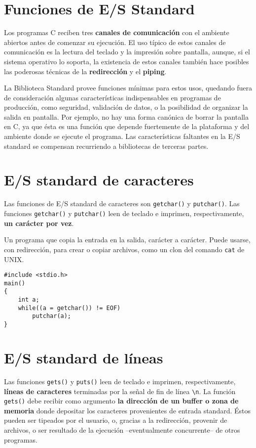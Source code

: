 \section{Funciones de E/S Standard}
\label{sec:esstandard}
Los programas C reciben tres \textbf{canales de comunicación} con el ambiente abiertos
antes de comenzar su ejecución. El uso típico de estos canales de comunicación
es la lectura del teclado y la impresión sobre pantalla, aunque, si el sistema
operativo lo soporta, la existencia de estos canales también hace posibles las poderosas técnicas de la
\textbf{redirección} y el \textbf{piping}. 


La Biblioteca Standard provee funciones mínimas para estos usos,
quedando fuera de consideración algunas características indispensables en
programas de producción, como seguridad, validación de datos, o la posibilidad de
organizar la salida en pantalla. Por ejemplo, no hay una forma canónica de
borrar la pantalla en C, ya que ésta es una función que depende fuertemente de
la plataforma y del ambiente donde se ejecute el programa. Las características faltantes en la
E/S standard se compensan recurriendo a bibliotecas de terceras partes.

\section{E/S standard de caracteres}
\label{subsec:esstandardcaract}
Las funciones de E/S standard de caracteres son \lstinline{getchar()} y \lstinline{putchar()}. Las funciones \lstinline{getchar()} y \lstinline{putchar()} leen de teclado e imprimen, respectivamente, \textbf{un carácter por vez}.

\begin{ejemplo}
Un programa que copia la entrada en la salida, carácter a
carácter. Puede usarse, con redirección, para crear o copiar archivos, como un
clon del comando \lstinline{cat} de UNIX.

\begin{lstlisting}
#include <stdio.h>
main()
{
    int a;
    while((a = getchar()) != EOF)
        putchar(a);
}
\end{lstlisting}
\end{ejemplo}

\section{E/S standard de líneas}
\label{subsec:esstandardlineas}
Las funciones \lstinline{gets()} y \lstinline{puts()} leen de teclado e imprimen, respectivamente,
\textbf{líneas de caracteres} terminadas por la señal de fin de línea \lstinline{\n}. La función
\lstinline{gets()} debe recibir como argumento \textbf{la dirección de un buffer o zona de memoria}
donde depositar los caracteres provenientes de entrada standard. Éstos pueden ser tipeados por 
el usuario, o, gracias a la redirección, provenir de archivos, o ser
resultado de la ejecución --eventualmente concurrente-- de otros programas. 

